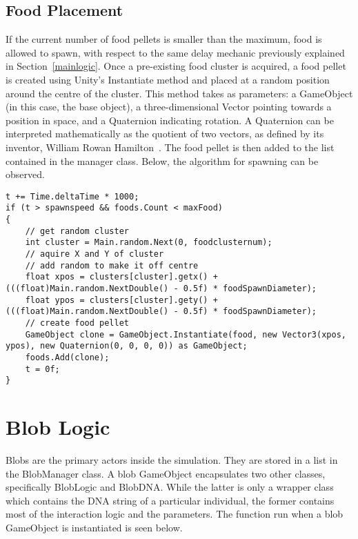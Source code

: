 \subsection{Food Placement}
If the current number of food pellets is smaller than the maximum, food is allowed to spawn, with respect to the same delay mechanic previously explained in Section~\ref{mainlogic}. Once a pre-existing food cluster is acquired, a food pellet is created using Unity's Instantiate method and placed at a random position around the centre of the cluster. This method takes as parameters: a GameObject (in this case, the base object), a three-dimensional Vector pointing towards a position in space, and a Quaternion indicating rotation. A Quaternion can be interpreted mathematically as the quotient of two vectors, as defined by its inventor, William Rowan Hamilton~\cite{hamilton1866elements}. The food pellet is then added to the list contained in the manager class. Below, the algorithm for spawning can be observed.

\begin{lstlisting}	
t += Time.deltaTime * 1000;
if (t > spawnspeed && foods.Count < maxFood)
{
    // get random cluster
    int cluster = Main.random.Next(0, foodclusternum);
    // aquire X and Y of cluster
    // add random to make it off centre
    float xpos = clusters[cluster].getx() + (((float)Main.random.NextDouble() - 0.5f) * foodSpawnDiameter);
    float ypos = clusters[cluster].gety() + (((float)Main.random.NextDouble() - 0.5f) * foodSpawnDiameter);
    // create food pellet
    GameObject clone = GameObject.Instantiate(food, new Vector3(xpos, ypos), new Quaternion(0, 0, 0, 0)) as GameObject;
    foods.Add(clone);
    t = 0f;
}
\end{lstlisting}
	
\section{Blob Logic}
Blobs are the primary actors inside the simulation. They are stored in a list in the BlobManager class. A blob GameObject encapsulates two other classes, specifically BlobLogic and BlobDNA. While the latter is only a wrapper class which contains the DNA string of a particular individual, the former contains most of the interaction logic and the parameters. The function run when a blob GameObject is instantiated is seen below.
	
